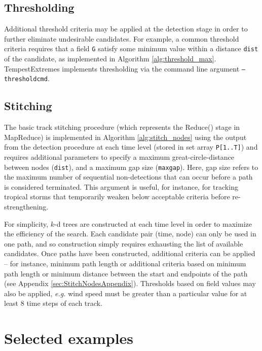 \documentclass[gmdd, hvmath, online]{copernicus_discussions}
\begin{document}
\subsection{Thresholding}

Additional threshold criteria may be applied at the detection stage in order to further eliminate undesirable candidates.  For example, a common threshold criteria requires that a field \texttt{G} satisfy some minimum value within a distance \texttt{dist} of the candidate, as implemented in Algorithm \ref{alg:threshold_max}.  TempestExtremes implements thresholding via the command line argument \texttt{--thresholdcmd}.

\subsection{Stitching}

The basic track stitching procedure (which represents the Reduce() stage in MapReduce) is implemented in Algorithm \ref{alg:stitch_nodes} using the output from the detection procedure at each time level (stored in set array \texttt{P[1..T]}) and requires additional parameters to specify a maximum great-circle-distance between nodes (\texttt{dist}), and a maximum gap size (\texttt{maxgap}).  Here, gap size refers to the maximum number of sequential non-detections that can occur before a path is considered terminated.  This argument is useful, for instance, for tracking tropical storms that temporarily weaken below acceptable criteria before re-strengthening.

For simplicity, $k$-d trees are constructed at each time level in order to maximize the efficiency of the search.  Each candidate pair (time, node) can only be used in one path, and so construction simply requires exhausting the list of available candidates.  Once paths have been constructed, additional criteria can be applied -- for instance, minimum path length or additional criteria based on minimum path length or minimum distance between the start and endpoints of the path (see Appendix \ref{sec:StitchNodesAppendix}).  Thresholds based on field values may also be applied, \textit{e.g.} wind speed must be greater than a particular value for at least 8 time steps of each track.

\section{Selected examples} \label{sec:SelectedExamples}
\end{document}
